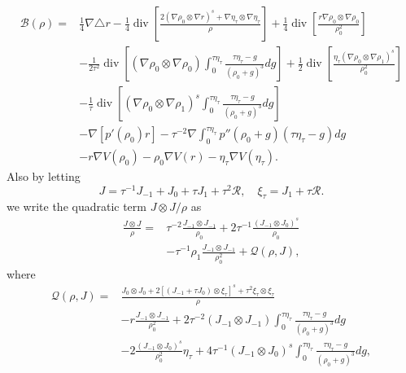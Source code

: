 \documentclass[english]{amsart}
\theoremstyle{plain}
\theoremstyle{definition}
\theoremstyle{remark}
\theoremstyle{plain}
\theoremstyle{plain}
\theoremstyle{plain}
\DeclareMathOperator{\diver}{div}
\numberwithin{equation}{section}
\begin{document}
\begin{equation}\label{eq:opB}
\begin{aligned}
\mathcal{B}(\rho)=&\frac14\nabla\triangle r-\frac14\diver\left[\frac{2(\nabla\rho_0\otimes \nabla r)^s+\nabla \eta_\tau\otimes \nabla\eta_\tau}{\rho}\right]+\frac14\diver\left[\frac{r\nabla \rho_0\otimes\nabla\rho_0}{\rho_0^2}\right]\\
&-\frac{1}{2\tau^2}\diver\left[(\nabla \rho_0\otimes\nabla\rho_0) \int_0^{\tau \eta_\tau}\frac{\tau \eta_\tau-g}{(\rho_0+g)^3}dg\right]+\frac{1}{2}\diver\left[\frac{\eta_\tau(\nabla \rho_0\otimes\nabla\rho_1)^s}{\rho_0^2}\right]\\
&-\frac{1}{\tau}\diver\left[(\nabla\rho_0\otimes\nabla\rho_1)^s\int_0^{\tau \eta_\tau}\frac{\tau \eta_\tau-g}{(\rho_0+g)^3}dg\right]\\
&-\nabla[p'(\rho_0)r]-\tau^{-2}\nabla\int_0^{\tau \eta_\tau} p''(\rho_0+g)(\tau \eta_\tau-g)dg\\
&-r\nabla V(\rho_0)-\rho_0\nabla V(r)-\eta_\tau\nabla V(\eta_\tau).
\end{aligned}
\end{equation}
Also by letting
\[
J=\tau^{-1}J_{-1}+J_0+\tau J_1+\tau^2\mathcal{R},\quad\xi_\tau=J_1+\tau\mathcal{R}.
\]
we write the quadratic term $J\otimes J/\rho$ as
\begin{equation}\label{eq:expquadJ}
\begin{aligned}
\frac{J\otimes J}{\rho}=&\tau^{-2}\frac{J_{-1}\otimes J_{-1}}{\rho_{0}}+2\tau^{-1}\frac{(J_{-1}\otimes J_{0})^s}{\rho_{0}}\\
&-\tau^{-1}\rho_{1}\frac{J_{-1}\otimes J_{-1}}{\rho_{0}^2}+\mathcal{Q}(\rho,J),
\end{aligned}
\end{equation}
where
\begin{align*}
\mathcal{Q}(\rho,J)=&\frac{J_{0}\otimes J_{0}+2[(J_{-1}+\tau J_{0})\otimes \xi_\tau ]^s+\tau^2\xi_\tau \otimes \xi_\tau }{\rho }\\
&-r\frac{J_{-1}\otimes J_{-1}}{\rho_{0}^2}+2\tau^{-2}(J_{-1}\otimes J_{-1})\int_0^{\tau \eta_{\tau}}\frac{\tau \eta_{\tau}-g}{(\rho_0+g)^3}dg\\
&-2\frac{(J_{-1}\otimes J_{0})^s}{\rho_{0}^2}\eta_{\tau}+4\tau^{-1}(J_{-1}\otimes J_{0})^s\int_0^{\tau \eta_{\tau}}\frac{\tau \eta_{\tau}-g}{(\rho_0+g)^3}dg,
\end{align*}
\end{document}
